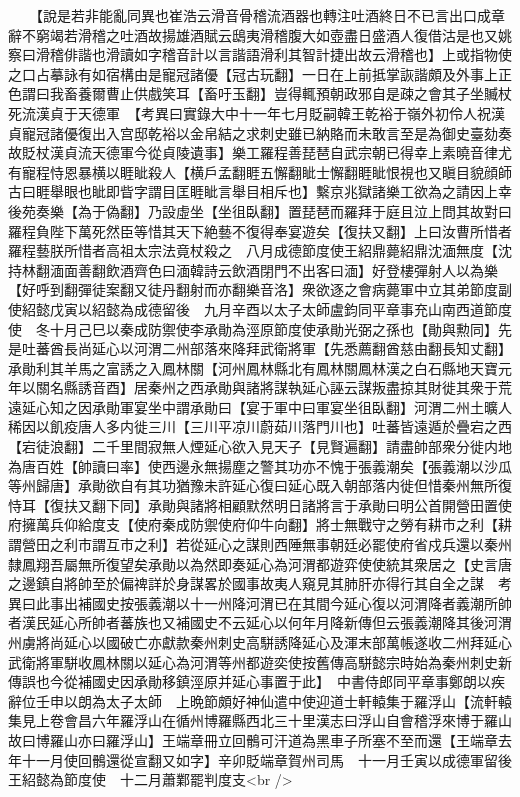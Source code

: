 　　【說是若非能亂同異也崔浩云滑音骨稽流酒器也轉注吐酒終日不已言出口成章辭不窮竭若滑稽之吐酒故揚雄酒賦云鴟夷滑稽腹大如壺盡日盛酒人復借沽是也又姚察曰滑稽俳諧也滑讀如字稽音計以言諧語滑利其智計捷出故云滑稽也】上或指物使之口占摹詠有如宿構由是寵冠諸優【冠古玩翻】一日在上前抵掌詼諧頗及外事上正色謂曰我畜養爾曹止供戲笑耳【畜吁玉翻】豈得輒預朝政邪自是疎之會其子坐贓杖死流漢貞于天德軍　【考異曰實錄大中十一年七月貶嗣韓王乾裕于嶺外初伶人祝漢貞寵冠諸優復出入宫邸乾裕以金帛結之求刺史雖已納賂而未敢言至是為御史臺劾奏故貶杖漢貞流天德軍今從貞陵遺事】樂工羅程善琵琶自武宗朝已得幸上素曉音律尤有寵程恃恩暴横以睚眦殺人【横戶孟翻睚五懈翻眦士懈翻睚眦恨視也又瞋目貌顔師古曰睚舉眼也眦即眥字謂目匡睚眦言舉目相斥也】繫京兆獄諸樂工欲為之請因上幸後苑奏樂【為于偽翻】乃設虛坐【坐徂臥翻】置琵琶而羅拜于庭且泣上問其故對曰羅程負陛下萬死然臣等惜其天下絶藝不復得奉宴遊矣【復扶又翻】上曰汝曹所惜者羅程藝朕所惜者高祖太宗法竟杖殺之　八月成德節度使王紹鼎薨紹鼎沈湎無度【沈持林翻湎面善翻飲酒齊色曰湎韓詩云飲酒閉門不出客曰湎】好登樓彈射人以為樂【好呼到翻彈徒案翻又徒丹翻射而亦翻樂音洛】衆欲逐之會病薨軍中立其弟節度副使紹懿戊寅以紹懿為成德留後　九月辛酉以太子太師盧鈞同平章事充山南西道節度使　冬十月己巳以秦成防禦使李承勛為涇原節度使承勛光弼之孫也【勛與勲同】先是吐蕃酋長尚延心以河渭二州部落來降拜武衛將軍【先悉薦翻酋慈由翻長知丈翻】承勛利其羊馬之富誘之入鳳林關【河州鳳林縣北有鳳林關鳳林漢之白石縣地天寶元年以關名縣誘音酉】居秦州之西承勛與諸將謀執延心誣云謀叛盡掠其財徙其衆于荒遠延心知之因承勛軍宴坐中謂承勛曰【宴于軍中曰軍宴坐徂臥翻】河渭二州土曠人稀因以飢疫唐人多内徙三川【三川平凉川蔚茹川落門川也】吐蕃皆遠遁於疊宕之西【宕徒浪翻】二千里間寂無人煙延心欲入見天子【見賢遍翻】請盡帥部衆分徙内地為唐百姓【帥讀曰率】使西邊永無揚塵之警其功亦不愧于張義潮矣【張義潮以沙瓜等州歸唐】承勛欲自有其功猶豫未許延心復曰延心既入朝部落内徙但惜秦州無所復恃耳【復扶又翻下同】承勛與諸將相顧默然明日諸將言于承勛曰明公首開營田置使府擁萬兵仰給度支【使府秦成防禦使府仰牛向翻】將士無戰守之勞有耕市之利【耕謂營田之利市謂互市之利】若從延心之謀則西陲無事朝廷必罷使府省戍兵還以秦州隸鳳翔吾屬無所復望矣承勛以為然即奏延心為河渭都遊弈使使統其衆居之【史言唐之邊鎮自將帥至於偏禆詳於身謀畧於國事故夷人窺見其肺肝亦得行其自全之謀　考異曰此事出補國史按張義潮以十一州降河渭已在其間今延心復以河渭降者義潮所帥者漢民延心所帥者蕃族也又補國史不云延心以何年月降新傳但云張義潮降其後河渭州虜將尚延心以國破亡亦獻款秦州刺史高駢誘降延心及渾末部萬帳遂收二州拜延心武衛將軍駢收鳳林關以延心為河渭等州都遊奕使按舊傳高駢懿宗時始為秦州刺史新傳誤也今從補國史因承勛移鎮涇原并延心事置于此】　中書侍郎同平章事鄭朗以疾辭位壬申以朗為太子太師　上晩節頗好神仙遣中使迎道士軒轅集于羅浮山【流軒轅集見上卷會昌六年羅浮山在循州博羅縣西北三十里漢志曰浮山自會稽浮來博于羅山故曰博羅山亦曰羅浮山】王端章冊立回鶻可汗道為黑車子所塞不至而還【王端章去年十一月使回鶻還從宣翻又如字】辛卯貶端章賀州司馬　十一月壬寅以成德軍留後王紹懿為節度使　十二月蕭鄴罷判度支<br />

